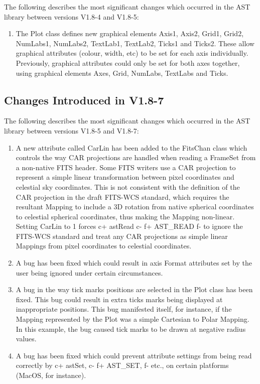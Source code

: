 \documentclass[twoside,11pt]{article}
\begin{document}
The following describes the most significant changes which 
occurred in the AST library between versions V1.8-4 and V1.8-5:

\begin{enumerate}

\item The Plot class defines new graphical elements Axis1, Axis2,
Grid1, Grid2, NumLabs1, NumLabs2, TextLab1, TextLab2, Ticks1 and Ticks2.
These allow graphical attributes (colour, width, etc) to be set for each
axis individually. Previously, graphical attributes could only be set for
both axes together, using graphical elements Axes, Grid, NumLabs,
TextLabs and Ticks.

\end{enumerate}


\subsection{Changes Introduced in V1.8-7}

The following describes the most significant changes which
occurred in the AST library between versions V1.8-5 and V1.8-7:

\begin{enumerate}

\item A new attribute called CarLin has been added to the FitsChan class
which controls the way CAR projections are handled when reading a
FrameSet from a non-native FITS header. Some FITS writers use a CAR 
projection to represent a simple linear transformation between pixel
coordinates and celestial sky coordinates. This is not consistent with
the definition of the CAR projection in the draft FITS-WCS standard, which
requires the resultant Mapping to include a 3D rotation from native
spherical coordinates to celestial spherical coordinates, thus making the
Mapping non-linear. Setting CarLin to 1 forces 
c+
astRead
c-
f+
AST\_READ
f-
to ignore the FITS-WCS standard and treat any CAR projections as simple 
linear Mappings from pixel coordinates to celestial coordinates.

\item A bug has been fixed which could result in axis Format attributes
set by the user being ignored under certain circumstances.

\item A bug in the way tick marks positions are selected in the Plot class
has been fixed. This bug could result in extra ticks marks being displayed at 
inappropriate positions. This bug manifested itself, for instance, if the 
Mapping represented by the Plot was a simple Cartesian to Polar Mapping.
In this example, the bug caused tick marks to be drawn at negative radius
values.

\item A bug has been fixed which could prevent attribute settings from
being read correctly by 
c+
astSet,
c-
f+
AST\_SET,
f-
etc., on certain platforms (MacOS, for instance).

\end{enumerate}
\end{document}
